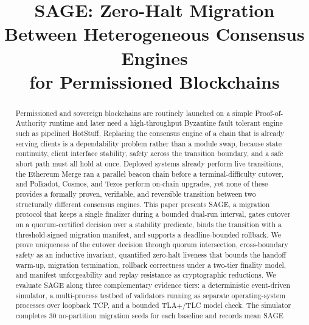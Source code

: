 \documentclass[journal]{IEEEtran}
\begin{document}
\title{SAGE: Zero-Halt Migration Between Heterogeneous Consensus Engines\\for Permissioned Blockchains}



\maketitle

\begin{abstract}
Permissioned and sovereign blockchains are routinely launched on a simple
Proof-of-Authority runtime and later need a high-throughput Byzantine fault tolerant
engine such as pipelined HotStuff. Replacing the consensus engine of a chain that is
already serving clients is a dependability problem rather than a module swap, because
state continuity, client interface stability, safety across the transition boundary, and
a safe abort path must all hold at once. Deployed systems already perform live
transitions, the Ethereum Merge ran a parallel beacon chain before a terminal-difficulty
cutover, and Polkadot, Cosmos, and Tezos perform on-chain upgrades, yet none of these
provides a formally proven, verifiable, and reversible transition between two structurally
different consensus engines. This paper presents SAGE, a migration protocol that keeps a
single finalizer during a bounded dual-run interval, gates cutover on a quorum-certified
decision over a stability predicate, binds the transition with a threshold-signed
migration manifest, and supports a deadline-bounded rollback. We prove uniqueness of the
cutover decision through quorum intersection, cross-boundary safety as an inductive
invariant, quantified zero-halt liveness that bounds the handoff warm-up, migration
termination, rollback correctness under a two-tier finality model, and manifest
unforgeability and replay resistance as cryptographic reductions. We evaluate SAGE along three complementary evidence tiers: a deterministic event-driven
simulator, a multi-process testbed of validators running as separate operating-system
processes over loopback TCP, and a bounded TLA+/TLC model check. The simulator
completes 30 no-partition migration seeds for each baseline and records mean SAGE

\end{abstract}
\end{document}
